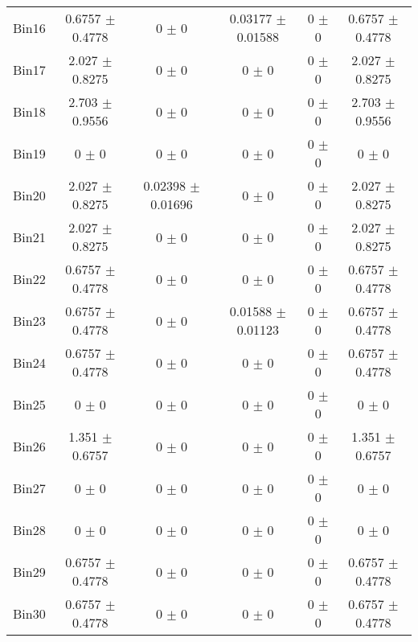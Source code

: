 \begin{tabular}{@{\extracolsep{4pt}}lccccc@{}}
     Bin16 & 0.6757 $\pm$ 0.4778 & 0 $\pm$ 0 & 0.03177 $\pm$ 0.01588 & 0 $\pm$ 0 & 0.6757 $\pm$ 0.4778 \\ 
     Bin17 & 2.027 $\pm$ 0.8275 & 0 $\pm$ 0 & 0 $\pm$ 0 & 0 $\pm$ 0 & 2.027 $\pm$ 0.8275 \\ 
     Bin18 & 2.703 $\pm$ 0.9556 & 0 $\pm$ 0 & 0 $\pm$ 0 & 0 $\pm$ 0 & 2.703 $\pm$ 0.9556 \\ 
     Bin19 & 0 $\pm$ 0 & 0 $\pm$ 0 & 0 $\pm$ 0 & 0 $\pm$ 0 & 0 $\pm$ 0 \\ 
     Bin20 & 2.027 $\pm$ 0.8275 & 0.02398 $\pm$ 0.01696 & 0 $\pm$ 0 & 0 $\pm$ 0 & 2.027 $\pm$ 0.8275 \\ 
     Bin21 & 2.027 $\pm$ 0.8275 & 0 $\pm$ 0 & 0 $\pm$ 0 & 0 $\pm$ 0 & 2.027 $\pm$ 0.8275 \\ 
     Bin22 & 0.6757 $\pm$ 0.4778 & 0 $\pm$ 0 & 0 $\pm$ 0 & 0 $\pm$ 0 & 0.6757 $\pm$ 0.4778 \\ 
     Bin23 & 0.6757 $\pm$ 0.4778 & 0 $\pm$ 0 & 0.01588 $\pm$ 0.01123 & 0 $\pm$ 0 & 0.6757 $\pm$ 0.4778 \\ 
     Bin24 & 0.6757 $\pm$ 0.4778 & 0 $\pm$ 0 & 0 $\pm$ 0 & 0 $\pm$ 0 & 0.6757 $\pm$ 0.4778 \\ 
     Bin25 & 0 $\pm$ 0 & 0 $\pm$ 0 & 0 $\pm$ 0 & 0 $\pm$ 0 & 0 $\pm$ 0 \\ 
     Bin26 & 1.351 $\pm$ 0.6757 & 0 $\pm$ 0 & 0 $\pm$ 0 & 0 $\pm$ 0 & 1.351 $\pm$ 0.6757 \\ 
     Bin27 & 0 $\pm$ 0 & 0 $\pm$ 0 & 0 $\pm$ 0 & 0 $\pm$ 0 & 0 $\pm$ 0 \\ 
     Bin28 & 0 $\pm$ 0 & 0 $\pm$ 0 & 0 $\pm$ 0 & 0 $\pm$ 0 & 0 $\pm$ 0 \\ 
     Bin29 & 0.6757 $\pm$ 0.4778 & 0 $\pm$ 0 & 0 $\pm$ 0 & 0 $\pm$ 0 & 0.6757 $\pm$ 0.4778 \\ 
     Bin30 & 0.6757 $\pm$ 0.4778 & 0 $\pm$ 0 & 0 $\pm$ 0 & 0 $\pm$ 0 & 0.6757 $\pm$ 0.4778 \\ 
\hline\hline
  \end{tabular}
